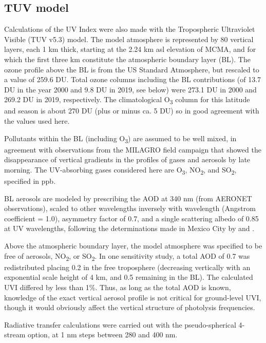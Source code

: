 \documentclass[journal=jacsat,manuscript=article]{achemso}
\begin{document}
\subsection{TUV model}

Calculations of the UV Index were also made with the Tropospheric
Ultraviolet Visible (TUV v5.3) model.\citep{Madronich_1987} The
model atmosphere is represented by 80 vertical layers, each 1 km thick,
starting at the 2.24 km asl elevation of MCMA, and for which the first
three km constitute the atmospheric boundary layer
(BL).\citep{Shaw_2007} The ozone profile above the BL is from the US
Standard Atmosphere, but rescaled to a value of 259.6 DU. Total ozone columns
including the BL contributions (of 13.7 DU in the year 2000 and 9.8 DU
in 2019, see below) were 273.1 DU in 2000 and 269.2 DU in 2019, respectively. The
climatological O\textsubscript{3} column for this latitude and season is
about 270 DU (plus or minus ca. 5 DU) so in good agreement with the
values used here.

Pollutants within the BL (including O\textsubscript{3}) are assumed to
be well mixed, in agreement with observations from the MILAGRO field
campaign that showed the disappearance of vertical gradients in the
profiles of gases \citep{Velasco_2008,Greenberg_2009} and aerosols
\citep{Rogers_2009,Lewandowski_2010} by late morning. The UV-absorbing gases
considered here are O\textsubscript{3}, NO\textsubscript{2},
and SO\textsubscript{2}, specified in ppb.

BL aerosols are modeled by prescribing the AOD at 340 nm (from AERONET
observations), scaled to other wavelengths inversely with wavelength
(Angstrom coefficient = 1.0), asymmetry factor of 0.7, and a single
scattering albedo of 0.85 at UV wavelengths, following the
determinations made in Mexico City by \citet{Corr_2009} and
\citet{Palancar_2013}.

Above the atmospheric boundary layer, the model atmosphere was specified to be free of aerosols,
NO\textsubscript{2}, or SO\textsubscript{2}. In one
sensitivity study, a total AOD of 0.7 was redistributed placing 0.2 in
the free troposphere (decreasing vertically with an exponential scale
height of 4 km, and 0.5 remaining in the BL). The calculated UVI
differed by less than 1\%. Thus, as long as the total AOD is known,
knowledge of the exact vertical aerosol profile is not critical for
ground-level UVI, though it would obviously affect the vertical structure of
photolysis frequencies.

Radiative transfer calculations were carried out with the
pseudo-spherical 4-stream option, at 1 nm steps between 280 and 400 nm.
\end{document}
